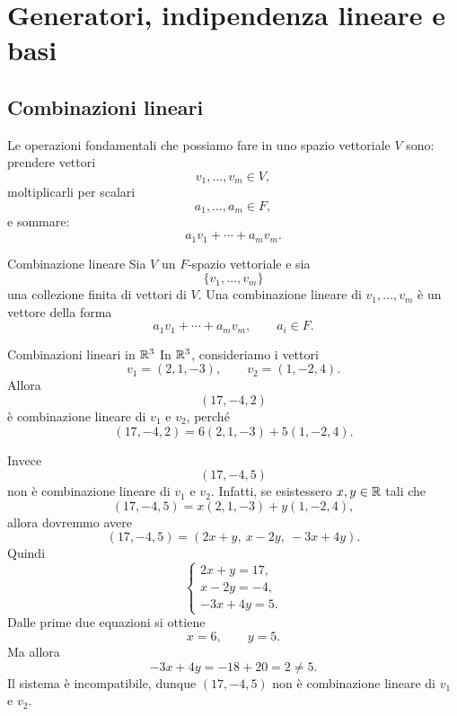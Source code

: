 \documentclass[a4paper]{article}
\begin{document}
\section{Generatori, indipendenza lineare e basi}

\subsection{Combinazioni lineari}

Le operazioni fondamentali che possiamo fare in uno spazio vettoriale \(V\) sono:
prendere vettori
\[
    v_1,\ldots,v_m\in V,
\]
moltiplicarli per scalari
\[
    a_1,\ldots,a_m\in F,
\]
e sommare:
\[
    a_1v_1+\cdots+a_mv_m.
\]

\begin{snippetdefinition}{Combinazione lineare}
    Sia \(V\) un \(F\)-spazio vettoriale e sia
    \[
        \{v_1,\ldots,v_m\}
    \]
    una collezione finita di vettori di \(V\). Una combinazione lineare di \(v_1,\ldots,v_m\) è un vettore della forma
    \[
        a_1v_1+\cdots+a_mv_m,
        \qquad
        a_i\in F.
    \]
\end{snippetdefinition}

\begin{snippetexample}{Combinazioni lineari in \(\mathbb{R}^3\)}
    In \(\mathbb{R}^3\), consideriamo i vettori
    \[
        v_1=(2,1,-3),
        \qquad
        v_2=(1,-2,4).
    \]
    Allora
    \[
        (17,-4,2)
    \]
    è combinazione lineare di \(v_1\) e \(v_2\), perché
    \[
        (17,-4,2)
        =
        6(2,1,-3)+5(1,-2,4).
    \]

    Invece
    \[
        (17,-4,5)
    \]
    non è combinazione lineare di \(v_1\) e \(v_2\). Infatti, se esistessero \(x,y\in\mathbb{R}\) tali che
    \[
        (17,-4,5)=x(2,1,-3)+y(1,-2,4),
    \]
    allora dovremmo avere
    \[
        (17,-4,5)
        =
        (2x+y,\ x-2y,\ -3x+4y).
    \]
    Quindi
    \[
        \begin{cases}
            2x+y=17,\\
            x-2y=-4,\\
            -3x+4y=5.
        \end{cases}
    \]
    Dalle prime due equazioni si ottiene
    \[
        x=6,
        \qquad
        y=5.
    \]
    Ma allora
    \[
        -3x+4y=-18+20=2\neq 5.
    \]
    Il sistema è incompatibile, dunque \((17,-4,5)\) non è combinazione lineare di \(v_1\) e \(v_2\).
\end{snippetexample}
\end{document}
